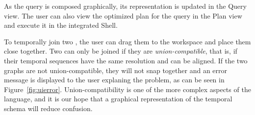 As the query is composed graphically, its \ql representation is
updated in the Query view.  The user can also view the optimized plan
for the query in the Plan view and execute it in the integrated Shell.

To temporally join two \tgs, the user can drag them to the workspace
and place them close together.  Two \tgs can only be joined if they
are {\em union-compatible}, that is, if their temporal sequences have
the same resolution and can be aligned.  If the two graphs are not
union-compatible, they will not snap together and an error message is
displayed to the user explaning the problem, as can be seen in
Figure~\ref{fig:uierror}.  Union-compatibility is one of the more
complex aspects of the language, and it is our hope that a graphical
representation of the \tg temporal schema will reduce confusion.


